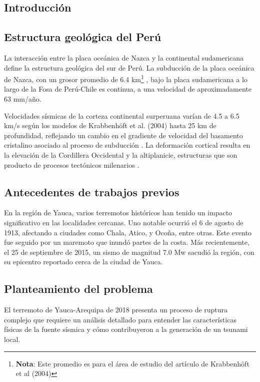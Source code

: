\documentclass[spanish,a4paper,11pt]{article}
\begin{document}
\subsection{Introducción} 

\subsection*{Estructura geológica del Perú}

La interacción entre la placa oceánica de Nazca y la continental sudamericana define la estructura geológica del sur de Perú. La subducción de la placa oceánica de Nazca, con un grosor promedio de 6.4 km\footnote{\textbf{Nota}: Este promedio es para el área de estudio del artículo de Krabbenhöft et al (2004)} \cite{Krabbenhoft2004}, bajo la placa sudamericana a lo largo de la Fosa de Perú-Chile\cite{Krabbenhoft2004} es continua, a una velocidad de aproximadamente 63 mm/año\cite{VillegasLanza2016}.

Velocidades sísmicas de la corteza continental surperuana varían de 4.5 a 6.5 km/s según los modelos de Krabbenhöft et al. (2004) hasta 25 km de profundidad, reflejando un cambio en el gradiente de velocidad del basamento cristalino asociado al proceso de subducción \cite{Krabbenhoft2004}. La deformación cortical resulta en la elevación de la Cordillera Occidental y la altiplanicie, estructuras que son producto de procesos tectónicos milenarios \cite{VillegasLanza2016}.

\subsection*{Antecedentes de trabajos previos}
En la región de Yauca, varios terremotos históricos han tenido un impacto significativo en las localidades cercanas. Uno notable ocurrió el 6 de agosto de 1913, afectando a ciudades como Chala, Atico, y Ocoña, entre otras. Este evento fue seguido por un maremoto que inundó partes de la costa. Más recientemente, el 25 de septiembre de 2015, un sismo de magnitud 7.0 Mw sacudió la región, con su epicentro reportado cerca de la ciudad de Yauca.

\subsection*{Planteamiento del problema}
El terremoto de Yauca-Arequipa de 2018 presenta un proceso de ruptura complejo que requiere un análisis detallado para entender las características físicas de la fuente sísmica y cómo contribuyeron a la generación de un tsunami local. \cite{CEN13}
\end{document}
